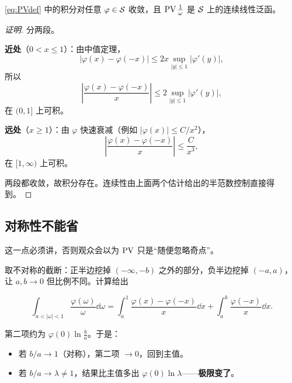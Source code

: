 \begin{prop}\label{prop:PVexists}
\eqref{eq:PVdef} 中的积分对任意 $\varphi\in\mathcal{S}$ 收敛，且 $\operatorname{PV}\frac1\omega$ 是 $\mathcal{S}$ 上的连续线性泛函。
\end{prop}

\begin{proof}[证明]
分两段。

\textbf{近处}（$0<x\le1$）：由中值定理，
\begin{equation}
|\varphi(x)-\varphi(-x)|\le 2x\sup_{|y|\le1}|\varphi'(y)|,
\end{equation}
所以
\begin{equation}
\left|\frac{\varphi(x)-\varphi(-x)}{x}\right|\le 2\sup_{|y|\le1}|\varphi'(y)| ,
\end{equation}
在 $(0,1]$ 上可积。

\textbf{远处}（$x\ge1$）：由 $\varphi$ 快速衰减（例如 $|\varphi(x)|\le C/x^{2}$），
\begin{equation}
\left|\frac{\varphi(x)-\varphi(-x)}{x}\right|\le\frac{C}{x^{3}},
\end{equation}
在 $[1,\infty)$ 上可积。

两段都收敛，故积分存在。连续性由上面两个估计给出的半范数控制直接得到。
\end{proof}

\subsection{对称性不能省}

这一点必须讲，否则观众会以为 $\operatorname{PV}$ 只是“随便忽略奇点”。

取不对称的截断：正半边挖掉 $(-\infty,-b)$ 之外的部分，负半边挖掉 $(-a,a)$，让 $a,b\to0$ 但比例不同。计算给出

\begin{equation}
\int_{a<|\omega|<1}\frac{\varphi(\omega)}{\omega}\dd\omega
=\int_{a}^{1}\frac{\varphi(x)-\varphi(-x)}{x}\dd x
+\int_{a}^{b}\frac{\varphi(-x)}{x}\dd x .
\end{equation}

第二项约为 $\varphi(0)\ln\frac{b}{a}$。于是：

\begin{itemize}[leftmargin=1.6em,itemsep=0.3em]
\item 若 $b/a\to1$（对称），第二项 $\to0$，回到主值。
\item 若 $b/a\to\lambda\neq1$，结果比主值多出 $\varphi(0)\ln\lambda$——\textbf{极限变了}。
\end{itemize}

